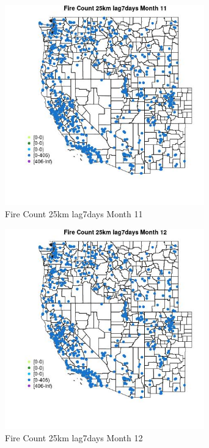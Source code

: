 \begin{figure} 
\centering  
\includegraphics[width=0.77\textwidth]{Code_Outputs/Report_ML_input_PM25_Step4_part_f_de_duplicated_aveswNAs_MapObsMo11Fire_Count_25km_lag7days.jpg} 
\caption{\label{fig:Report_ML_input_PM25_Step4_part_f_de_duplicated_aveswNAsMapObsMo11Fire_Count_25km_lag7days}Fire Count 25km lag7days Month 11} 
\end{figure} 
 

\clearpage 

\begin{figure} 
\centering  
\includegraphics[width=0.77\textwidth]{Code_Outputs/Report_ML_input_PM25_Step4_part_f_de_duplicated_aveswNAs_MapObsMo12Fire_Count_25km_lag7days.jpg} 
\caption{\label{fig:Report_ML_input_PM25_Step4_part_f_de_duplicated_aveswNAsMapObsMo12Fire_Count_25km_lag7days}Fire Count 25km lag7days Month 12} 
\end{figure} 
 

